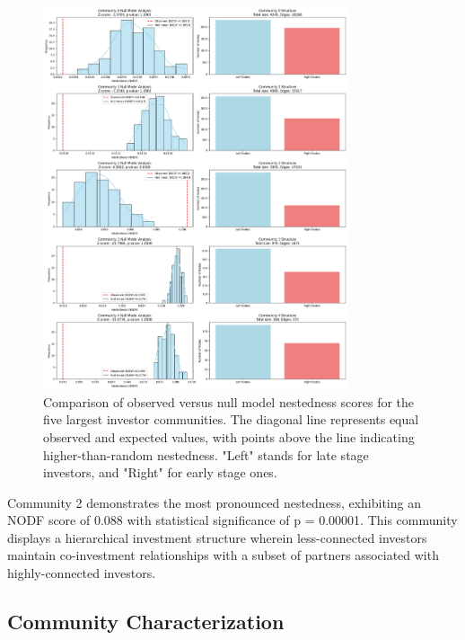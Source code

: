 \documentclass[12pt]{article}
\begin{document}
\begin{figure}[htbp]
\centering
\includegraphics[width=0.8\textwidth]{./assets/null-model-analysis-top-5.png}
\caption{Comparison of observed versus null model nestedness scores for the five largest investor communities. The diagonal line represents equal observed and expected values, with points above the line indicating higher-than-random nestedness. "Left" stands for late stage investors, and "Right" for early stage ones.}
\label{fig:nestedness_comparison}
\end{figure}

\newcommand{\interestingCommunity}{2}
\newcommand{\interestingCommunityNODF}{0.088}
\newcommand{\interestingCommunityPValue}{0.00001}

Community \interestingCommunity{} demonstrates the most pronounced nestedness, exhibiting an NODF score of \interestingCommunityNODF{} with statistical significance of p = \interestingCommunityPValue{}. This community displays a hierarchical investment structure wherein less-connected investors maintain co-investment relationships with a subset of partners associated with highly-connected investors.

\subsection{Community Characterization}
\end{document}
